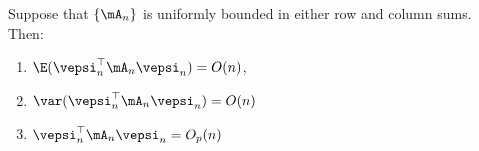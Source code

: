 \documentclass[english,12pt]{book}\usepackage[]{graphicx}\usepackage[]{xcolor}
\begin{document}

% 
% 
% 


\begin{lemma}\label{lemma:O-lemma-lee}
Suppose that  $\left\lbrace \mA_n\right\rbrace$ is uniformly bounded in either row and column sums. Then:

\begin{enumerate}
  \item $\E(\vepsi_n^\top\mA_n\vepsi_n) = O(n)$,
  \item $\var(\vepsi_n^\top\mA_n\vepsi_n) = O(n)$
  \item $\vepsi_n^\top\mA_n\vepsi_n = O_p(n)$
\end{enumerate}
\end{lemma}
\end{document}
